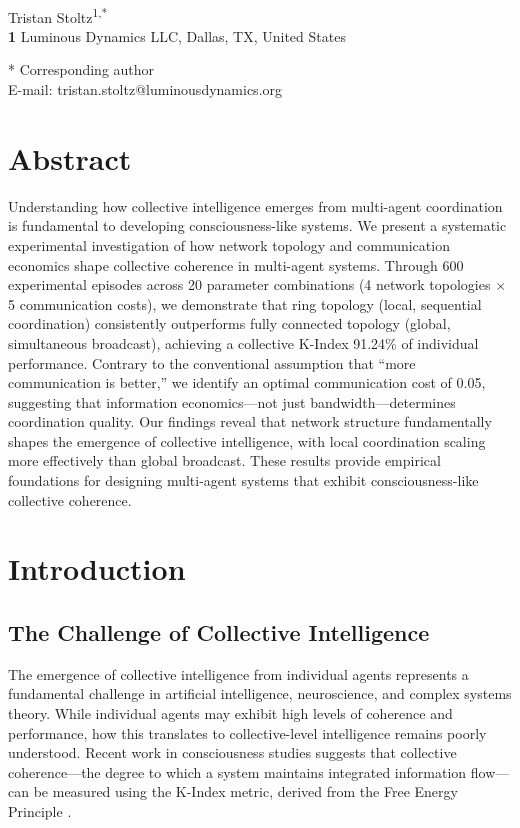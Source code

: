 \documentclass[10pt,letterpaper]{article}
\begin{document}
\vspace*{0.2in}

\begin{flushleft}
{\Large
\textbf{}
}
\newline
\\
Tristan Stoltz\textsuperscript{1,*}
\\
\bigskip
\textbf{1} Luminous Dynamics LLC, Dallas, TX, United States
\\
\bigskip

* Corresponding author\\
E-mail: tristan.stoltz@luminousdynamics.org
\end{flushleft}

\section*{Abstract}
Understanding how collective intelligence emerges from multi-agent coordination is fundamental to developing consciousness-like systems. We present a systematic experimental investigation of how network topology and communication economics shape collective coherence in multi-agent systems. Through 600 experimental episodes across 20 parameter combinations (4 network topologies $\times$ 5 communication costs), we demonstrate that ring topology (local, sequential coordination) consistently outperforms fully connected topology (global, simultaneous broadcast), achieving a collective K-Index 91.24\% of individual performance. Contrary to the conventional assumption that ``more communication is better,'' we identify an optimal communication cost of 0.05, suggesting that information economics—not just bandwidth—determines coordination quality. Our findings reveal that network structure fundamentally shapes the emergence of collective intelligence, with local coordination scaling more effectively than global broadcast. These results provide empirical foundations for designing multi-agent systems that exhibit consciousness-like collective coherence.

\section*{Introduction}

\subsection*{The Challenge of Collective Intelligence}
The emergence of collective intelligence from individual agents represents a fundamental challenge in artificial intelligence, neuroscience, and complex systems theory. While individual agents may exhibit high levels of coherence and performance, how this translates to collective-level intelligence remains poorly understood. Recent work in consciousness studies suggests that collective coherence—the degree to which a system maintains integrated information flow—can be measured using the K-Index metric, derived from the Free Energy Principle \cite{Friston2010,Ramstead2018}.
\end{document}
